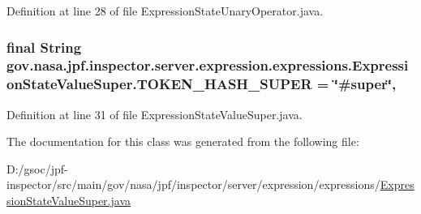 Definition at line 28 of file Expression\+State\+Unary\+Operator.\+java.

\subsubsection[{\texorpdfstring{T\+O\+K\+E\+N\+\_\+\+H\+A\+S\+H\+\_\+\+S\+U\+P\+ER}{TOKEN_HASH_SUPER}}]{\setlength{\rightskip}{0pt plus 5cm}final String gov.\+nasa.\+jpf.\+inspector.\+server.\+expression.\+expressions.\+Expression\+State\+Value\+Super.\+T\+O\+K\+E\+N\+\_\+\+H\+A\+S\+H\+\_\+\+S\+U\+P\+ER = \char`\"{}\#super\char`\"{}\hspace{0.3cm}{\ttfamily [static]}, {\ttfamily [private]}}\hypertarget{classgov_1_1nasa_1_1jpf_1_1inspector_1_1server_1_1expression_1_1expressions_1_1_expression_state_value_super_ab4ef1d41a5534563505035d19e6ed946}{}\label{classgov_1_1nasa_1_1jpf_1_1inspector_1_1server_1_1expression_1_1expressions_1_1_expression_state_value_super_ab4ef1d41a5534563505035d19e6ed946}


Definition at line 31 of file Expression\+State\+Value\+Super.\+java.



The documentation for this class was generated from the following file\+:\begin{DoxyCompactItemize}
\item 
D\+:/gsoc/jpf-\/inspector/src/main/gov/nasa/jpf/inspector/server/expression/expressions/\hyperlink{_expression_state_value_super_8java}{Expression\+State\+Value\+Super.\+java}\end{DoxyCompactItemize}
